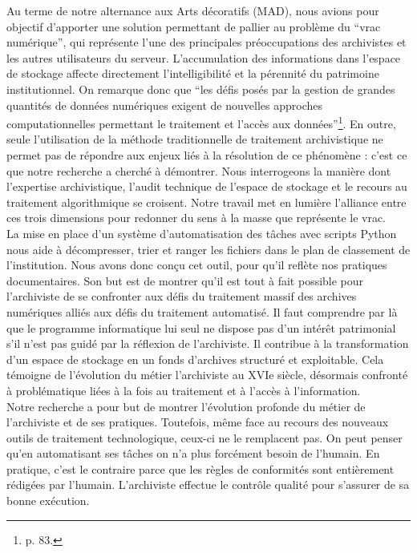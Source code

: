 

Au terme de notre alternance aux Arts décoratifs (MAD), nous avions pour objectif d'apporter une solution permettant de pallier au problème du \enquote{vrac numérique}, qui représente l'une des principales préoccupations des archivistes et les autres utilisateurs du serveur. L'accumulation des informations dans l'espace de stockage affecte directement l’intelligibilité et la pérennité du patrimoine institutionnel. On remarque donc que \enquote{les défis posés par la gestion de grandes quantités de données numériques exigent de nouvelles approches computationnelles permettant le traitement et l'accès aux données}\footnote{\cite{saad2026intelligence} p. 83.}. En outre, seule l'utilisation de la méthode traditionnelle de traitement archivistique ne permet pas de répondre aux enjeux liés à la résolution de ce phénomène : c'est ce que notre recherche a cherché à démontrer. Nous interrogeons la manière dont l'expertise archivistique, l'audit technique de l'espace de stockage et le recours au traitement algorithmique se croisent. Notre travail met en lumière l'alliance entre ces trois dimensions pour redonner du sens à la masse que représente le vrac.\\[0.1cm]

La mise en place d'un système d'automatisation des tâches avec scripts Python nous aide à décompresser, trier et ranger les fichiers dans le plan de classement de l'institution. Nous avons donc conçu cet outil, pour qu'il reflète nos pratiques documentaires. Son but est de montrer qu'il est tout à fait possible pour l'archiviste de se confronter aux défis du traitement massif des archives numériques alliés aux défis du traitement automatisé. Il faut comprendre par là que le programme informatique lui seul ne dispose pas d'un intérêt patrimonial s'il n'est pas guidé par la réflexion de l'archiviste. Il contribue à la transformation d'un espace de stockage en un fonds d'archives structuré et exploitable. Cela témoigne de l'évolution du métier l'archiviste au XVIe siècle, désormais confronté à problématique liées à la fois au traitement et à l'accès à l'information.\\[0.1cm]

Notre recherche a pour but de montrer l'évolution profonde du métier de l'archiviste et de ses pratiques. Toutefois, même face au recours des nouveaux outils de traitement technologique, ceux-ci ne le remplacent pas. On peut penser qu'en automatisant ses tâches on n'a plus forcément besoin de l'humain. En pratique, c'est le contraire parce que les règles de conformités sont entièrement rédigées par l'humain. L'archiviste effectue le contrôle qualité pour s'assurer de sa bonne exécution.\\[0.1cm]

